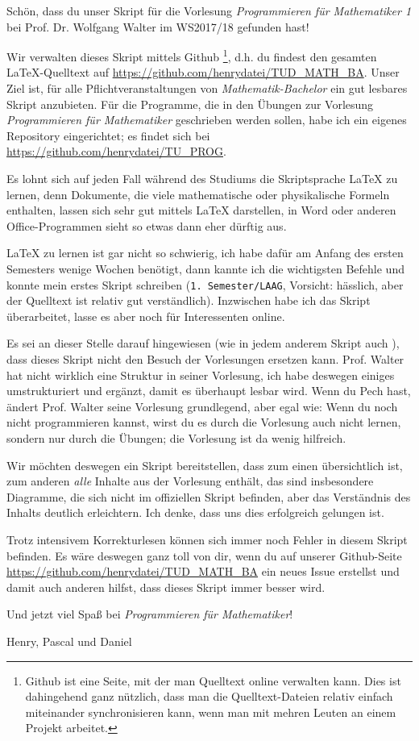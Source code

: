 Schön, dass du unser Skript für die Vorlesung \textit{Programmieren für Mathematiker 1} bei Prof. Dr. Wolfgang Walter im WS2017/18 gefunden hast!

Wir verwalten dieses Skript mittels Github \footnote{Github ist eine Seite, mit der man Quelltext online verwalten kann. Dies ist dahingehend ganz nützlich, dass man die Quelltext-Dateien relativ einfach miteinander synchronisieren kann, wenn man mit mehren Leuten an einem Projekt arbeitet.}, d.h. du findest den gesamten \LaTeX-Quelltext auf \url{https://github.com/henrydatei/TUD_MATH_BA}. Unser Ziel ist, für alle Pflichtveranstaltungen von \textit{Mathematik-Bachelor} ein gut lesbares Skript anzubieten. Für die Programme, die in den Übungen zur Vorlesung \textit{Programmieren für Mathematiker} geschrieben werden sollen, habe ich ein eigenes Repository eingerichtet; es findet sich bei \url{https://github.com/henrydatei/TU_PROG}.

Es lohnt sich auf jeden Fall während des Studiums die Skriptsprache \LaTeX{} zu lernen, denn Dokumente, die viele mathematische oder physikalische Formeln enthalten, lassen sich sehr gut mittels \LaTeX{} darstellen, in Word oder anderen Office-Programmen sieht so etwas dann eher dürftig aus.

\LaTeX{} zu lernen ist gar nicht so schwierig, ich habe dafür am Anfang des ersten Semesters wenige Wochen benötigt, dann kannte ich die wichtigsten Befehle und konnte mein erstes Skript schreiben (\texttt{1. Semester/LAAG}, Vorsicht: hässlich, aber der Quelltext ist relativ gut verständlich). Inzwischen habe ich das Skript überarbeitet, lasse es aber noch für Interessenten online.

Es sei an dieser Stelle darauf hingewiesen (wie in jedem anderem Skript auch \smiley{}), dass dieses Skript nicht den Besuch der Vorlesungen ersetzen kann. Prof. Walter hat nicht wirklich eine Struktur in seiner Vorlesung, ich habe deswegen einiges umstrukturiert und ergänzt, damit es überhaupt lesbar wird. Wenn du Pech hast, ändert Prof. Walter seine Vorlesung grundlegend, aber egal wie: Wenn du noch nicht programmieren kannst, wirst du es durch die Vorlesung auch nicht lernen, sondern nur durch die Übungen; die Vorlesung ist da wenig hilfreich.

Wir möchten deswegen ein Skript bereitstellen, dass zum einen übersichtlich ist, zum anderen \textit{alle} Inhalte aus der Vorlesung enthält, das sind insbesondere Diagramme, die sich nicht im offiziellen Skript befinden, aber das Verständnis des Inhalts deutlich erleichtern. Ich denke, dass uns dies erfolgreich gelungen ist.

Trotz intensivem Korrekturlesen können sich immer noch Fehler in diesem Skript befinden. Es wäre deswegen ganz toll von dir, wenn du auf unserer Github-Seite \url{https://github.com/henrydatei/TUD_MATH_BA} ein neues Issue erstellst und damit auch anderen hilfst, dass dieses Skript immer besser wird.

Und jetzt viel Spaß bei \textit{Programmieren für Mathematiker}!

\begin{flushright}
	Henry, Pascal und Daniel
\end{flushright}
